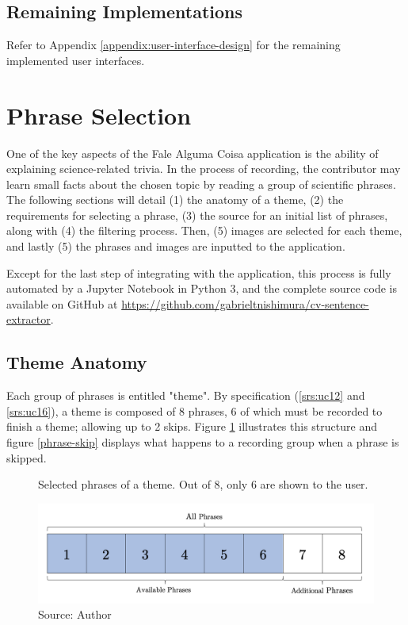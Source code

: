 \subsection{Remaining Implementations}

Refer to Appendix \ref{appendix:user-interface-design} for the remaining implemented user interfaces.

\clearpage
\section{Phrase Selection}
\label{sec:app-phrase-selection}

One of the key aspects of the Fale Alguma Coisa application is the ability of explaining science-related trivia. In the process of recording, the contributor may learn small facts about the chosen topic by reading a group of scientific phrases. The following sections will detail (1) the anatomy of a theme, (2) the requirements for selecting a phrase, (3) the source for an initial list of phrases, along with (4) the filtering process. Then, (5) images are selected for each theme, and lastly (5) the phrases and images are inputted to the application. 

Except for the last step of integrating with the application, this process is fully automated by a Jupyter Notebook in Python 3, and the complete source code is available on GitHub at \url{https://github.com/gabrieltnishimura/cv-sentence-extractor}.

\subsection{Theme Anatomy}

Each group of phrases is entitled "theme". By specification (\ref{srs:uc12} and \ref{srs:uc16}), a theme is composed of 8 phrases, 6 of which must be recorded to finish a theme; allowing up to 2 skips. Figure \ref{fig:falealgumacoisa-phrase-all} illustrates this structure and figure \ref{phrase-skip} displays what happens to a recording group when a phrase is skipped.

\begin{figure}[h]
    \centering
    \caption{Selected phrases of a theme. Out of 8, only 6 are shown to the user.}
    \includegraphics[width=\linewidth]{images/phrase-selection/phrase-all.png}
    \caption*{Source: Author}
    \label{fig:falealgumacoisa-phrase-all}
\end{figure}

